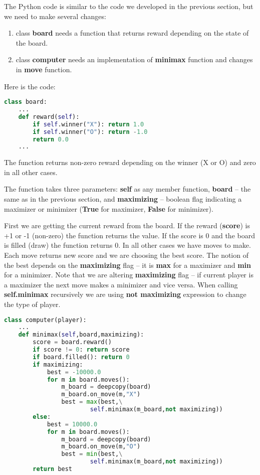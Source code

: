 The Python code is similar to the code we developed in the previous section,
but we need to make several changes:

\begin{enumerate}
\item class \textbf{board} needs a function that returns reward
depending on the state of the board.
\item class \textbf{computer} needs an implementation of \textbf{minimax}
function and changes in \textbf{move} function.
\end{enumerate}

Here is the code:

\begin{lstlisting}[language=Python,style=codelst2,caption={Tic-Tac-Toe: the board, reward function}]
class board:
    ...
    def reward(self):
        if self.winner("X"): return 1.0
        if self.winner("O"): return -1.0
        return 0.0
    ...
\end{lstlisting}
The function returns non-zero reward depending on the winner (X or O)
and zero in all other cases.

The function takes three parameters: \textbf{self} as 
any member function, \textbf{board} -- the same as in the previous
section, and \textbf{maximizing} -- boolean flag indicating a
maximizer or minimizer (\textbf{True} for maximizer, 
\textbf{False} for minimizer).

First we are getting the current reward
from the board. If the reward (\textbf{score}) is +1 or -1 (non-zero)
the function returns the value. 
If the score is 0 and the board is filled (draw) the function returns 0.
In all other cases we have moves to make. Each move returns new
score and we are choosing the best score. The notion of the best depends on
the \textbf{maximizing} flag -- it is \textbf{max} for a maximizer
and \textbf{min} for a minimizer.
Note that we are altering
\textbf{maximizing} flag -- if current player is a maximizer the next move
makes a minimizer and vice versa. When calling \textbf{self.minimax}
recursively we are using \textbf{not maximizing} expression to change
the type of player.

\newpage

\begin{lstlisting}[language=Python,style=codelst2,caption={Tic-Tac-Toe: minimax computer player}]
class computer(player):
    ...
    def minimax(self,board,maximizing):
        score = board.reward()
        if score != 0: return score
        if board.filled(): return 0
        if maximizing:
            best = -10000.0
            for m in board.moves():
                m_board = deepcopy(board)
                m_board.on_move(m,"X")
                best = max(best,\
                        self.minimax(m_board,not maximizing))
        else:
            best = 10000.0
            for m in board.moves():
                m_board = deepcopy(board)
                m_board.on_move(m,"O")
                best = min(best,\
                        self.minimax(m_board,not maximizing))
        return best
\end{lstlisting}

